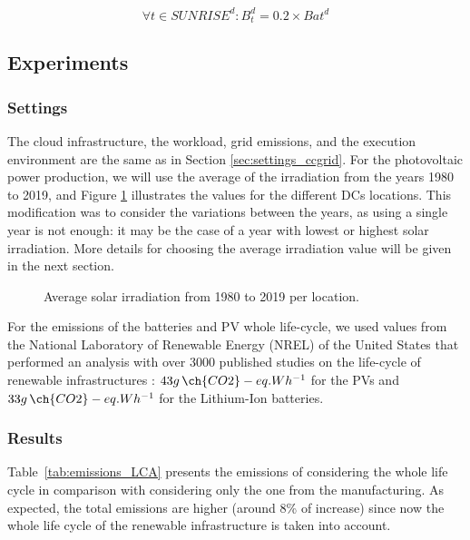 \begin{equation} \label{eq:b_initial_level}
  \forall t \in SUNRISE^d :  B^d_t =  0.2 \times Bat^d
\end{equation}

\subsection{Experiments}
\label{sec:ex_lca_pv}

\subsubsection{Settings} 

The cloud infrastructure, the workload, grid emissions, and the execution environment are the same as in Section  \ref{sec:settings_ccgrid}. For the photovoltaic power production, we will use the average of the irradiation from the years 1980 to 2019, and Figure \ref{fig:pv_ghi_avg} illustrates the values for the different DCs locations. This modification was to consider the variations between the years, as using a single year is not enough: it may be the case of a year with lowest or highest solar irradiation. More details for choosing the average irradiation value will be given in the next section.

\begin{figure}[!htbp]  
  \centering
   {}
   \caption{Average solar irradiation from 1980 to 2019 per location.}
  \label{fig:pv_ghi_avg}
\end{figure}

For the  emissions of the batteries and PV whole life-cycle, we used values from the National Laboratory of Renewable Energy (NREL) of the United States that performed an analysis with over 3000 published studies on the life-cycle of renewable infrastructures \cite{nrel_lifecycle_2021}: $43 g\,\ch{CO2}-eq.Wh^{-1}$ for the PVs and $33 g\,\ch{CO2}-eq.Wh^{-1}$ for the Lithium-Ion batteries.

\subsubsection{Results}

Table~\ref{tab:emissions_LCA} presents the  emissions of considering the whole life cycle in comparison with considering only the one from the manufacturing. As expected, the total  emissions are higher (around 8\% of increase) since now the whole life cycle of the renewable infrastructure is taken into account. 

